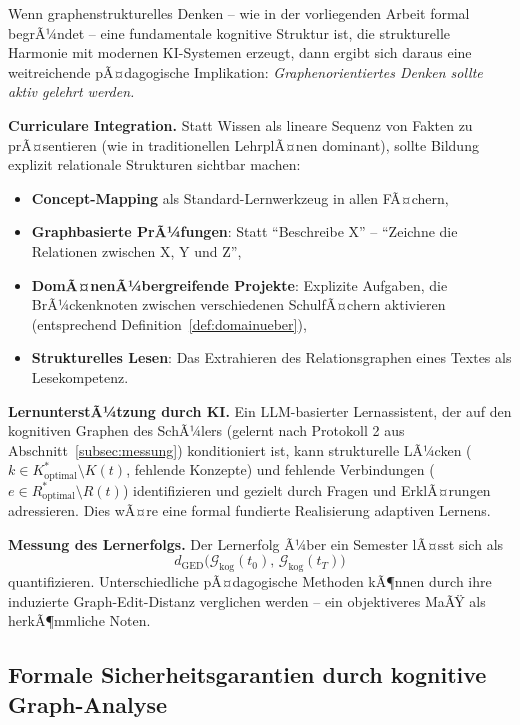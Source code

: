 ﻿\documentclass[12pt,a4paper]{article}
\theoremstyle{plain}
\theoremstyle{definition}
\theoremstyle{remark}
\newcommand{\GG}{\mathcal{G}}
\begin{document}
Wenn graphenstrukturelles Denken -- wie in der vorliegenden Arbeit formal begrÃ¼ndet -- eine fundamentale kognitive Struktur ist, die strukturelle Harmonie mit modernen KI-Systemen erzeugt, dann ergibt sich daraus eine weitreichende pÃ¤dagogische Implikation: \emph{Graphenorientiertes Denken sollte aktiv gelehrt werden.}

\textbf{Curriculare Integration.} Statt Wissen als lineare Sequenz von Fakten zu prÃ¤sentieren (wie in traditionellen LehrplÃ¤nen dominant), sollte Bildung explizit relationale Strukturen sichtbar machen:
\begin{itemize}
  \item \textbf{Concept-Mapping} als Standard-Lernwerkzeug in allen FÃ¤chern,
  \item \textbf{Graphbasierte PrÃ¼fungen}: Statt ``Beschreibe X'' -- ``Zeichne die Relationen zwischen X, Y und Z'',
  \item \textbf{DomÃ¤nenÃ¼bergreifende Projekte}: Explizite Aufgaben, die BrÃ¼ckenknoten zwischen verschiedenen SchulfÃ¤chern aktivieren (entsprechend Definition~\ref{def:domainueber}),
  \item \textbf{Strukturelles Lesen}: Das Extrahieren des Relationsgraphen eines Textes als Lesekompetenz.
\end{itemize}

\textbf{LernunterstÃ¼tzung durch KI.} Ein LLM-basierter Lernassistent, der auf den kognitiven Graphen des SchÃ¼lers (gelernt nach Protokoll 2 aus Abschnitt~\ref{subsec:messung}) konditioniert ist, kann strukturelle LÃ¼cken ($k \in K^*_{\text{optimal}} \setminus K(t)$, fehlende Konzepte) und fehlende Verbindungen ($e \in R^*_{\text{optimal}} \setminus R(t)$) identifizieren und gezielt durch Fragen und ErklÃ¤rungen adressieren. Dies wÃ¤re eine formal fundierte Realisierung adaptiven Lernens.

\textbf{Messung des Lernerfolgs.} Der Lernerfolg Ã¼ber ein Semester lÃ¤sst sich als
\[
  d_{\text{GED}}\!\bigl(\GG_{\text{kog}}(t_0),\, \GG_{\text{kog}}(t_T)\bigr)
\]
quantifizieren. Unterschiedliche pÃ¤dagogische Methoden kÃ¶nnen durch ihre induzierte Graph-Edit-Distanz verglichen werden -- ein objektiveres MaÃŸ als herkÃ¶mmliche Noten.

\subsection{Formale Sicherheitsgarantien durch kognitive Graph-Analyse}
\label{subsec:sicherheit}
\end{document}
